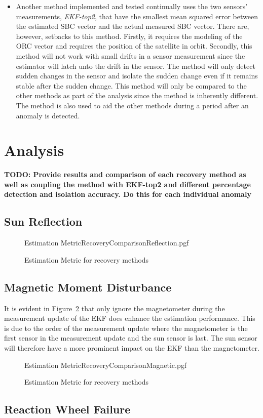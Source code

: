\begin{itemize}
	\item Another method implemented and tested continually uses the two sensors' measurements, \emph{EKF-top2}, that have the smallest mean squared error between the estimated SBC vector and the actual measured SBC vector. There are, however, setbacks to this method. Firstly, it requires the modeling of the ORC vector and requires the position of the satellite in orbit. Secondly, this method will not work with small drifts in a sensor measurement since the estimator will latch unto the drift in the sensor. The method will only detect sudden changes in the sensor and isolate the sudden change even if it remains stable after the sudden change. This method will only be compared to the other methods as part of the analysis since the method is inherently different. The method is also used to aid the other methods during a period after an anomaly is detected.
\end{itemize}

\section{Analysis}
\textbf{TODO: Provide results and comparison of each recovery method as well as coupling the method with EKF-top2 and different percentage detection and isolation accuracy. Do this for each individual anomaly}

\subsection{Sun Reflection}

\begin{figure}[!htb]
	\centering
	\def\pgfwidth{7cm}
	{Estimation MetricRecoveryComparisonReflection.pgf}
	
	\caption{Estimation Metric for recovery methods}
	\label{fig:RecoveryComparisonReflection}
\end{figure}

\subsection{Magnetic Moment Disturbance}
It is evident in Figure~\ref{fig:RecoveryComparisonMagnetic} that only ignore the magnetometer during the measurement update of the EKF does enhance the estimation performance. This is due to the order of the measurement update where the magnetometer is the first sensor in the measurement update and the sun sensor is last. The sun sensor will therefore have a more prominent impact on the EKF than the magnetometer.
\begin{figure}[!htb]
	\centering
	\def\pgfwidth{7cm}
	{Estimation MetricRecoveryComparisonMagnetic.pgf}
	
	\caption{Estimation Metric for recovery methods}
	\label{fig:RecoveryComparisonMagnetic}
\end{figure}

\subsection{Reaction Wheel Failure}
